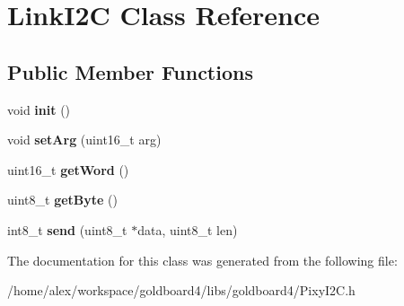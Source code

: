 \hypertarget{class_link_i2_c}{}\section{Link\+I2C Class Reference}
\label{class_link_i2_c}
\subsection*{Public Member Functions}
\begin{DoxyCompactItemize}
\item 
void {\bfseries init} ()\hypertarget{class_link_i2_c_a88bb723d5558bdc9011d383ec6ead785}{}\label{class_link_i2_c_a88bb723d5558bdc9011d383ec6ead785}

\item 
void {\bfseries set\+Arg} (uint16\+\_\+t arg)\hypertarget{class_link_i2_c_a5f15394cf091ad6f209a64cf0f0db7ae}{}\label{class_link_i2_c_a5f15394cf091ad6f209a64cf0f0db7ae}

\item 
uint16\+\_\+t {\bfseries get\+Word} ()\hypertarget{class_link_i2_c_a7f0d784f6aea082e92392b86aa26e137}{}\label{class_link_i2_c_a7f0d784f6aea082e92392b86aa26e137}

\item 
uint8\+\_\+t {\bfseries get\+Byte} ()\hypertarget{class_link_i2_c_a13520ec81c6b8d2fb5dd443b35cbb778}{}\label{class_link_i2_c_a13520ec81c6b8d2fb5dd443b35cbb778}

\item 
int8\+\_\+t {\bfseries send} (uint8\+\_\+t $\ast$data, uint8\+\_\+t len)\hypertarget{class_link_i2_c_ae7b12321ba087e83fe265ede5e84bc07}{}\label{class_link_i2_c_ae7b12321ba087e83fe265ede5e84bc07}

\end{DoxyCompactItemize}


The documentation for this class was generated from the following file\+:\begin{DoxyCompactItemize}
\item 
/home/alex/workspace/goldboard4/libs/goldboard4/Pixy\+I2\+C.\+h\end{DoxyCompactItemize}
